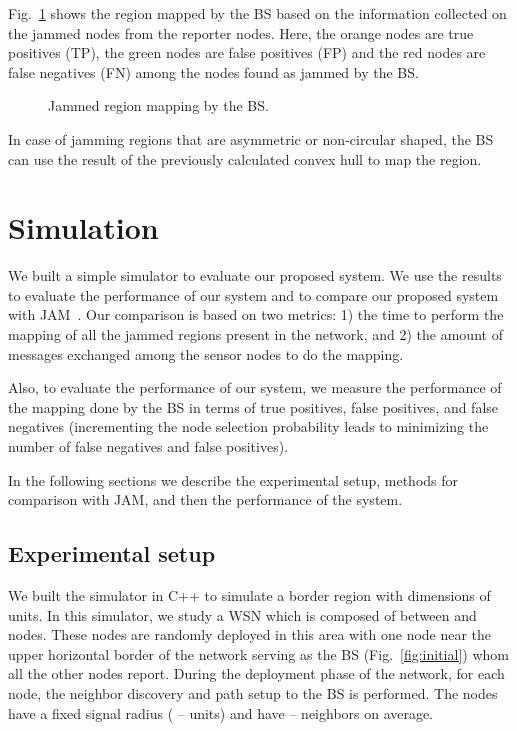 \documentclass[conference]{IEEEtran}
\begin{document}
\begin{list}{}{\leftmargin=1em}
Fig.~\ref{fig:areamap2} shows the region mapped by the BS based on the information collected on the jammed nodes from the reporter nodes. Here, the orange nodes are true positives (TP), the green nodes are false positives (FP) and the red nodes are false negatives (FN) among the nodes found as jammed by the BS.

\begin{figure}
  \begin{center}
    \hspace{.1in}    
  \end{center}
  \caption{Jammed region mapping by the BS.}
  \label{fig:areamap2}
\end{figure}


\end{list}

\noindent
In case of jamming regions that are asymmetric or non-circular shaped, the BS can use the result of the previously calculated convex hull to map the region.

\section{Simulation}
\label{sim}
We built a simple simulator to evaluate our proposed system. We use the results to evaluate the performance of our system and to compare our proposed system with JAM~\cite{JAM}. Our comparison is based on two metrics: 1) the time to perform the mapping of all the jammed regions present in the network, and 2) the amount of messages exchanged among the sensor nodes to do the mapping. 

Also, to evaluate the performance of our system, we measure the performance of the mapping done by the BS in terms of true positives, false positives, and false negatives (incrementing the node selection probability leads to minimizing the number of false negatives and false positives).  

In the following sections we describe the experimental setup, methods for comparison with JAM, and then the performance of the system.

\subsection{Experimental setup}
We built the simulator in C++ to simulate a border region with dimensions of  units. In this simulator, we study a WSN which is composed of between  and  nodes. These nodes are randomly deployed in this area with one node near the upper horizontal border of the network serving as the BS (Fig.~\ref{fig:initial}) whom all the other nodes report. During the deployment phase of the network, for each node, the neighbor discovery and path setup to the BS is performed. The nodes have a fixed signal radius ( --  units) and have  --  neighbors on average.
\end{document}
